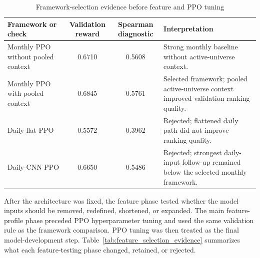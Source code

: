 \begin{table}[H]
\centering
\scriptsize
\caption{Framework-selection evidence before feature and PPO tuning}
\label{tab:framework_selection_results}
\begin{tabularx}{\textwidth}{L{4.5cm}ccY}
\toprule
Framework or check & Validation reward & Spearman diagnostic & Interpretation \\
\midrule
Monthly PPO without pooled context & 0.6710 & 0.5608 & Strong monthly baseline without active-universe context. \\
Monthly PPO with pooled context & 0.6845 & 0.5761 & Selected framework; pooled active-universe context improved validation ranking quality. \\
Daily-flat PPO & 0.5572 & 0.3962 & Rejected; flattened daily path did not improve ranking quality. \\
Daily-CNN PPO & 0.6650 & 0.5486 & Rejected; strongest daily-input follow-up remained below the selected monthly framework. \\
\bottomrule
\end{tabularx}
\end{table}

After the architecture was fixed, the feature phase tested whether the model inputs should be removed, redefined, shortened, or expanded. The main feature-profile phase preceded PPO hyperparameter tuning and used the same validation rule as the framework comparison. PPO tuning was then treated as the final model-development step. Table~\ref{tab:feature_selection_evidence} summarizes what each feature-testing phase changed, retained, or rejected.

